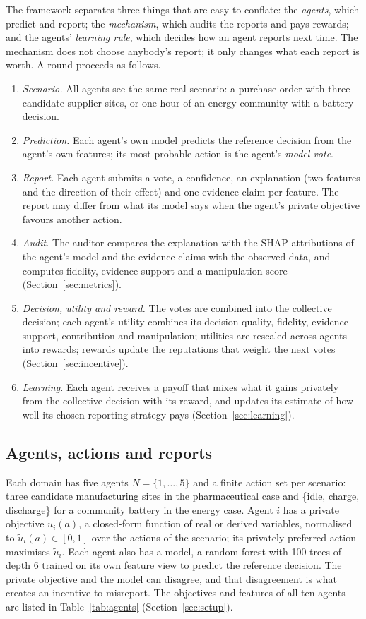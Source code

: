 \documentclass[pdflatex,sn-basic]{sn-jnl}
\begin{document}
The framework separates three things that are easy to conflate: the \emph{agents}, which
predict and report; the \emph{mechanism}, which audits the reports and pays rewards; and the
agents' \emph{learning rule}, which decides how an agent reports next time. The mechanism does
not choose anybody's report; it only changes what each report is worth. A round proceeds as
follows.
\begin{enumerate}
\item \emph{Scenario.} All agents see the same real scenario: a purchase order with three
candidate supplier sites, or one hour of an energy community with a battery decision.
\item \emph{Prediction.} Each agent's own model predicts the reference decision from the
agent's own features; its most probable action is the agent's \emph{model vote}.
\item \emph{Report.} Each agent submits a vote, a confidence, an explanation (two features and
the direction of their effect) and one evidence claim per feature. The report may differ from
what its model says when the agent's private objective favours another action.
\item \emph{Audit.} The auditor compares the explanation with the SHAP attributions of the
agent's model and the evidence claims with the observed data, and computes fidelity,
evidence support and a manipulation score (Section~\ref{sec:metrics}).
\item \emph{Decision, utility and reward.} The votes are combined into the collective
decision; each agent's utility combines its decision quality, fidelity, evidence support,
contribution and manipulation; utilities are rescaled across agents into rewards; rewards
update the reputations that weight the next votes (Section~\ref{sec:incentive}).
\item \emph{Learning.} Each agent receives a payoff that mixes what it gains privately from
the collective decision with its reward, and updates its estimate of how well its chosen
reporting strategy pays (Section~\ref{sec:learning}).
\end{enumerate}

\subsection{Agents, actions and reports}\label{sec:game}

Each domain has five agents $N=\{1,\dots,5\}$ and a finite action set per scenario: three
candidate manufacturing sites in the pharmaceutical case and \{idle, charge, discharge\} for a
community battery in the energy case. Agent $i$ has a private objective $u_i(a)$, a
closed-form function of real or derived variables, normalised to $\tilde u_i(a)\in[0,1]$ over
the actions of the scenario; its privately preferred action maximises $\tilde u_i$. Each agent
also has a model, a random forest \citep{breiman2001} with 100 trees of depth 6 trained on its
own feature view to predict the reference decision. The private objective and the model can
disagree, and that disagreement is what creates an incentive to misreport. The objectives and
features of all ten agents are listed in Table~\ref{tab:agents} (Section~\ref{sec:setup}).
\end{document}
